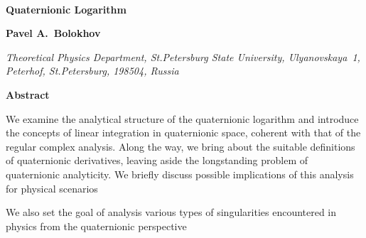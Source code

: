 \documentclass[epsfig,12pt]{article}
\begin{document}
\begin{titlepage}
\ \ 
\vskip 2cm
\begin{center}
{  \Large \bf  Quaternionic Logarithm }
\end{center}
\vskip 0.5cm

\begin{center}

 {\large
 \bf   Pavel A.~Bolokhov
 }
\end {center}

\begin{center}
{\it Theoretical Physics Department, St.Petersburg State University, Ulyanovskaya~1, 
	Peterhof, St.Petersburg, 198504, Russia}
\end{center}




\begin{center}
{\large\bf Abstract}
\end{center}

\hspace{0.3cm}
	We examine the analytical structure of the quaternionic logarithm and
	introduce the concepts of linear integration in quaternionic space, coherent
	with that of the regular complex analysis.
	Along the way, we bring about the suitable definitions of quaternionic derivatives,
	leaving aside the longstanding problem of quaternionic analyticity.
	We briefly discuss possible implications of this analysis for physical scenarios

	We also set the goal of analysis various types of singularities encountered in
	physics from the quaternionic perspective
\vspace{2cm}


\end{titlepage}




\end{document}
